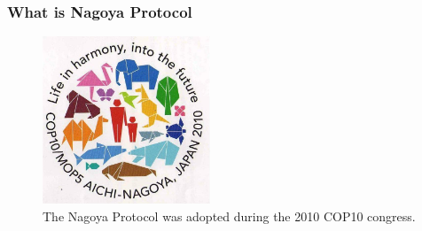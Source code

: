 \subsubsection{What is Nagoya Protocol}

\begin{figure}
  \begin{center}
    \includegraphics [width=50mm] {images/chap1/Working with Phototrophs/Acquiring organisms/image1.jpg}
  \end{center}
 \caption{The Nagoya Protocol was adopted during the 2010 COP10 congress.}
\end{figure}
\FloatBarrier


